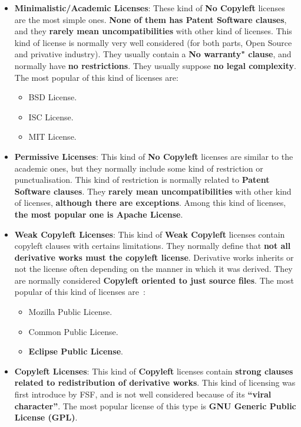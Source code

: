 \documentclass[a4paper, 12pt]{book}
\begin{document}
\begin{itemize}\itemsep0pt
 \item{\textbf{Minimalistic/Academic Licenses}}: These kind of \textbf{No Copyleft} licenses are the most simple ones. \textbf{None of them has Patent Software clauses}, and they \textbf{rarely mean uncompatibilities} with other kind of licenses. This kind of license is normally very well considered (for both parts, Open Source and privative industry). They usually contain a \textbf{No warranty" clause}, and normally have \textbf{no restrictions}. They usually suppose \textbf{no legal complexity}. The most popular of this kind of licenses are:
   \begin{itemize}\itemsep0pt
    \item{BSD License}.
    \item{ISC License}.
    \item{MIT License}.
   \end{itemize}
 \item{\textbf{Permissive Licenses}}: This kind of \textbf{No Copyleft} licenses are similar to the academic ones, but they normally include some kind of restriction or punctualisation. This kind of restriction is normally related to \textbf{Patent Software clauses}. They \textbf{rarely mean uncompatibilities} with other kind of licenses, \textbf{although there are exceptions}. Among this kind of licenses, \textbf{the most popular one is Apache License}.
 \item{\textbf{Weak Copyleft Licenses}}: This kind of \textbf{Weak Copyleft} licenses contain copyleft clauses with certains limitations. They normally define that \textbf{not all derivative works must the copyleft license}. Derivative works inherits or not the license often depending on the manner in which it was derived. They are normally considered \textbf{Copyleft oriented to just source files}. The most popular of this kind of licenses are~\cite{FSFLicense}:
   \begin{itemize}\itemsep0pt
    \item{Mozilla Public License}.
    \item{Common Public License}.
    \item{\textbf{Eclipse Public License}}.
   \end{itemize}
 \item{\textbf{Copyleft Licenses}}: This kind of \textbf{Copyleft} licenses contain \textbf{strong clauses related to redistribution of derivative works}. This kind of licensing was first introduce by FSF, and is not well considered because of its \textbf{``viral character''}. The most popular license of this type is \textbf{GNU Generic Public License (GPL)}.
\end{itemize}
\end{document}
